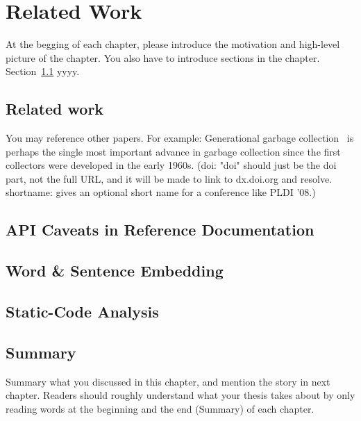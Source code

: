 \chapter{Related Work}
\label{cha:background}
At the begging of each chapter, please introduce the motivation and high-level
picture of the chapter. You also have to introduce sections in the
chapter. \\

Section~\ref{sec:relatedwork} yyyy.\\

\section{Related work}
\label{sec:relatedwork}
You may reference other papers. For example: 
Generational garbage collection~\citep{LH:83,Moon:84,Ungar:84} is perhaps the
single most important advance in garbage collection since the first collectors
were developed in the early 1960s. (doi: "doi" should just be the doi part, not
the full URL, and it will be made to link to dx.doi.org and resolve.
shortname: gives an optional short name for a conference like PLDI '08.)

\section{API Caveats in Reference Documentation}

\section{Word \& Sentence Embedding}

\section{Static-Code Analysis}


\section{Summary}
Summary what you discussed in this chapter, and mention the story in next
chapter. Readers should roughly understand what your thesis takes about by only reading
words at the beginning and the end (Summary) of each chapter.



